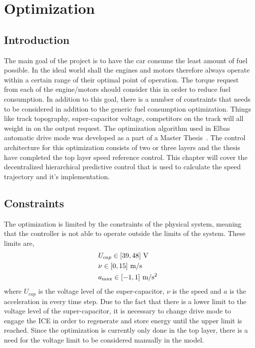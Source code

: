 \chapter{Optimization}
\section{Introduction}
The main goal of the project is to have the car consume the least amount of fuel
possible.  In the ideal world shall the engines and motors therefore always
operate within a certain range of their optimal point of operation. The torque
request from each of the engine/motors should consider this in order to reduce
fuel consumption. In addition to this goal, there is a number of constraints
that needs to be considered in addition to the generic fuel consumption
optimization.  Things like track topography, super-capacitor voltage,
competitors on the track  will all weight in on the output request. The
optimization algorithm used in Elbas automatic drive mode was developed as a
part of a Master Thesis~\cite{liu2016}. The control architecture for this
optimization consists of two or three layers and the thesis have completed the
top layer speed reference control. This chapter will cover the decentralized
hierarchical predictive control that is used to calculate the speed trajectory
and it's implementation.

\section{Constraints}
The optimization is limited by the constraints of the physical system, meaning that
the controller is not able to operate outside the limits of the system. These limits
are,
\begin{align}
    &U_{cap} \in [39,48]~\textup{V} \\
    &\nu \in [0,15]~\textup{m/s}\\
    &a_{\max} \in [-1,1]~\textup{m/s$^2$}
\end{align}
where $U_{cap}$ is the voltage level of the super-capacitor, $\nu$ is the speed
and $a$ is the acceleration in every time step. Due to the fact that there is a
lower limit to the voltage level of the super-capacitor, it is necessary to
change drive mode to engage the ICE in order to regenerate and store energy
until the upper limit is reached. Since the optimization is currently only done
in the top layer, there is a need for the voltage limit to be considered
manually in the model.

